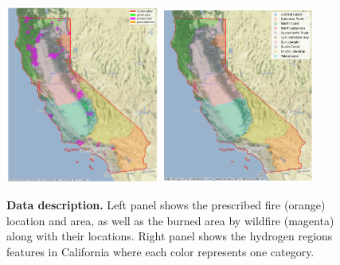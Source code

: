 \documentclass{article}
\begin{document}
\begin{figure}[t!]
  \centering
\includegraphics[width=0.45\textwidth]{latex_template/figs/prescribed_0.png}
\includegraphics[width=0.45\textwidth]{figs/HRarea_1.png}

\caption{\textbf{Data description.} Left panel shows the prescribed fire (orange) location and area, as well as the burned area by wildfire (magenta) along with their locations. Right panel shows the hydrogen regions features in California where each color represents one category. }
\label{fig:data}
\end{figure}
\end{document}
